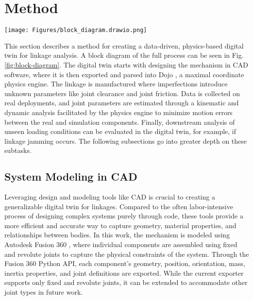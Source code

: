 \section{Method} \label{method}
\begin{figure*}
    \centering
    \texttt{[image: Figures/block\_diagram.drawio.png]}
    \caption{A block diagram illustrating the data-driven, physics-based digital twin pipeline for linkage analysis. The process begins with a CAD model, exported to the physics engine for rigid body simulation. Simultaneously, real-world data is captured through various sensors (e.g., video, motion capture, and other sensing technologies) and synthesized using methods like optical flow or Kalman filters to estimate joint positions. The synthesized data undergoes kinematic analysis to estimate joint clearance, followed by dynamic analysis to estimate joint friction. These parameters are fed back into the physics engine for downstream analysis, including simulations of unseen loading conditions, jamming detection, and evaluating force/torque requirements.}
    \label{fig:block-diagram}
\end{figure*}

This section describes a method for creating a data-driven, physics-based digital twin for linkage analysis. A block diagram of the full process can be seen in Fig. \ref{fig:block-diagram}. The digital twin starts with designing the mechanism in CAD software, where it is then exported and parsed into Dojo \cite{howell_dojo_2022}, a maximal coordinate physics engine. The linkage is manufactured where imperfections introduce unknown parameters like joint clearance and joint friction. Data is collected on real deployments, and joint parameters are estimated through a kinematic and dynamic analysis facilitated by the physics engine to minimize motion errors between the real and simulation components. Finally, downstream analysis of unseen loading conditions can be evaluated in the digital twin, for example, if linkage jamming occurs. The following subsections go into greater depth on these subtasks.   

\subsection{System Modeling in CAD}

Leveraging design and modeling tools like CAD is crucial to creating a generalizable digital twin for linkages. Compared to the often labor-intensive process of designing complex systems purely through code, these tools provide a more efficient and accurate way to capture geometry, material properties, and relationships between bodies. In this work, the mechanism is modeled using Autodesk Fusion 360 \cite{autodesk_fusion_2014}, where individual components are assembled using fixed and revolute joints to capture the physical constraints of the system. Through the Fusion 360 Python API, each component's geometry, position, orientation, mass, inertia properties, and joint definitions are exported. While the current exporter supports only fixed and revolute joints, it can be extended to accommodate other joint types in future work.


